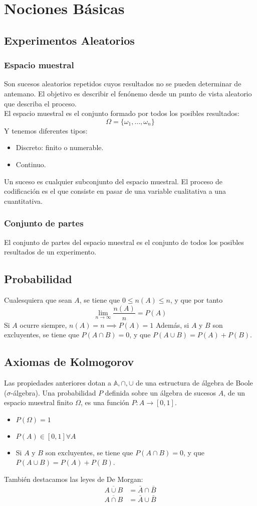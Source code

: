 \documentclass{./Probabilidad.tex}
\begin{document}
\chapter{Nociones Básicas}
\section{Experimentos Aleatorios}
\subsection{Espacio muestral}
Son sucesos aleatorios repetidos cuyos resultados no se pueden determinar de
antemano. El objetivo es describir el fenónemo desde un punto de vista aleatorio
que describa el proceso.\\
El espacio muestral es el conjunto formado por todos los posibles resultados:
$$
\Omega = \{ \omega_{1},\dots ,\omega_{n} \}
$$
Y tenemos diferentes tipos:
\begin{itemize}
	\item Discreto: finito o numerable.
	\item Continuo.
\end{itemize}
Un suceso es cualquier subconjunto del espacio muestral.
El proceso de codificación es el que consiste en pasar de una variable cualitativa a una cuantitativa.
\subsection{Conjunto de partes}
El conjunto de partes del espacio muestral es el conjunto de todos los posibles resultados de un experimento.
\section{Probabilidad}
Cualesquiera que sean $A$, se tiene que $0\leq n(A)\leq n$, y que por tanto
$$
\lim_{ n \to \infty } \frac{n(A)}{n}=P(A)
$$
Si $A$ ocurre siempre, $n(A)=n \implies P(A)=1$
Además, si $A$ y $B$ son excluyentes, se tiene que $P(A \cap B) = 0$, y que $P(A \cup B) = P(A)+P(B)$.
\section{Axiomas de Kolmogorov}
Las propiedades anteriores dotan a $\mathbb{A}, \cap, \cup$ de una estructura de álgebra de Boole ($\sigma$-álgebra).
Una probabilidad $P$ definida sobre un álgebra de sucesos $A$, de un espacio muestral finito $\Omega$, es una función $P:A\to[0,1]$.
\begin{itemize}
	\item $P(\Omega)=1$
	\item $P(A) \in [0,1] \forall A$
	\item Si $A$ y $B$ son excluyentes, se tiene que $P(A \cap B) = 0$, y que $P(A \cup B) = P(A)+P(B)$.
\end{itemize}
También destacamos las leyes de De Morgan:
\begin{equation}
	\begin{split}
		\overline{A \cup B} &= \bar{A} \cap \bar{B}\\
		\overline{A \cap B} &= \bar{A} \cup \bar{B}
	\end{split}
\end{equation}
\end{document}
